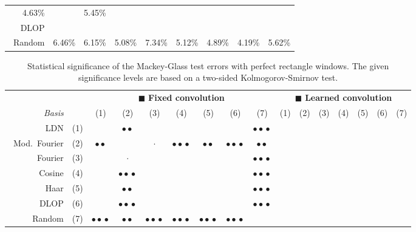 \begin{table}[p]
\begin{tabular}{r  r r r r  r r r r}
	4.63\% &
	 \cellcolor{CornflowerBlue!25}{3.84\%} &
	5.45\% \\
	\symFIR~DLOP &
	 \cellcolor{CornflowerBlue!50}{4.79\%} &
	 \cellcolor{CornflowerBlue!75}{4.52\%} &
	 \cellcolor{CornflowerBlue!50}{3.88\%} &
	 \cellcolor{CornflowerBlue!25}{5.50\%} &
	 \cellcolor{CornflowerBlue!75}{4.68\%} &
	 \cellcolor{CornflowerBlue!50}{4.42\%} &
	 \cellcolor{CornflowerBlue!75}{3.78\%} &
	 \cellcolor{CornflowerBlue!75}{5.23\%} \\
	\symFIR~Random &
	6.46\% &
	6.15\% &
	5.08\% &
	7.34\% &
	5.12\% &
	4.89\% &
	4.19\% &
	5.62\% \\
	\bottomrule
	\end{tabular}
\end{table}

\begin{table}[p]
	\newcommand{\sigA}{\ensuremath{\cdot}}
	\newcommand{\sigB}{\ensuremath{\bullet\bullet}}
	\newcommand{\sigC}{\ensuremath{\bullet\!\bullet\!\bullet}}
	\caption[Statistical significance of the Mackey-Glass test errors with perfect rectangle windows]{Statistical significance of the Mackey-Glass test errors with perfect rectangle windows. The given significance levels are based on a two-sided Kolmogorov-Smirnov test.}
	\label{tbl:mackey_glass_ne_significance}
	\centering\small\sffamily
	\setlength{\tabcolsep}{6.2pt}
	\begin{tabular}{r r  c c c c c c c  c c c c c c c}
	\toprule
	& & \multicolumn{7}{c}{{\color{skyblue1}$\blacksquare$} \textbf{Fixed convolution}}
	& \multicolumn{7}{c}{{\color{aluminium2}$\blacksquare$} \textbf{Learned convolution}} \\
	\cmidrule(r){3-9}\cmidrule(l){10-16}
	\emph{Basis} & & (1) & (2) & (3) & (4) & (5) & (6) & (7)  & (1) & (2) & (3) & (4) & (5) & (6) & (7) \\
	\midrule
	\symLTI~LDN & (1) &
	 &
	\sigB &
	 &
	 &
	 &
	 &
	\sigC &
	 &
	 &
	 &
	 &
	 &
	 &
	 \\
	\symLTI~Mod.~Fourier & (2) &
	\sigB &
	 &
	\sigA &
	\sigC &
	\sigB &
	\sigC &
	\sigB &
	 &
	 &
	 &
	 &
	 &
	 &
	 \\
	\symSDT~Fourier & (3) &
	 &
	\sigA &
	 &
	 &
	 &
	 &
	\sigC &
	 &
	 &
	 &
	 &
	 &
	 &
	 \\
	\symSDT~Cosine & (4) &
	 &
	\sigC &
	 &
	 &
	 &
	 &
	\sigC &
	 &
	 &
	 &
	 &
	 &
	 &
	 \\
	\symSDT~Haar & (5) &
	 &
	\sigB &
	 &
	 &
	 &
	 &
	\sigC &
	 &
	 &
	 &
	 &
	 &
	 &
	 \\
	\symFIR~DLOP & (6) &
	 &
	\sigC &
	 &
	 &
	 &
	 &
	\sigC &
	 &
	 &
	 &
	 &
	 &
	 &
	 \\
	\symFIR~Random & (7) &
	\sigC &
	\sigB &
	\sigC &
	\sigC &
	\sigC &
	\sigC &
	 &
	 &
	 &
	 &
	 &
	 &
	 &
	 \\
	\bottomrule
	\end{tabular}
\end{table}
